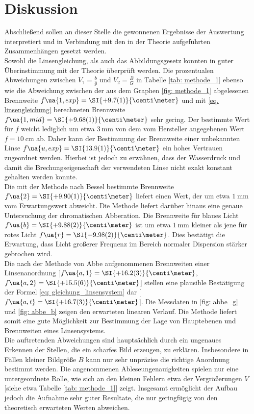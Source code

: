 \section{Diskussion}
Abschließend sollen an dieser Stelle die gewonnenen Ergebnisse der Auswertung interpretiert und
in Verbindung mit den in der Theorie aufgeführten Zusammenhängen gesetzt werden.\\
Sowohl die Linsengleichung, als auch das Abbildungsgesetz konnten in guter Überinstimmung
mit der Theorie überprüft werden. Die prozentualen Abweichungen zwischen $V_1 = \frac{b}{g}$ und $V_2 = \frac{B}{G}$ %
in Tabelle \ref{tab: methode_1} ebenso wie die Abweichung zwischen der aus dem Graphen \ref{fig: methode_1} abgelesenen Brennweite $f\ua{1, exp} = \SI{+9.7(1)}{\centi\meter}$ und mit \eqref{eq. linsengleichung} %
berechneten Brennweite $f\ua{1, mid} = \SI{+9.68(1)}{\centi\meter}$ sehr gering. Der bestimmte Wert für $f$ weicht lediglich um etwa $\SI{3}{\milli\meter}$ von dem vom Hersteller
angegebenen Wert $f = \SI{10}{\centi\meter}$ ab. Daher kann der Bestimmung der Brennweite einer unbekannten Linse $  f\ua{u, exp} = \SI{13.9(1)}{\centi\meter}$
ein hohes Vertrauen zugeordnet werden. Hierbei ist jedoch zu erwähnen, dass der Wasserdruck und damit die Brechungseigenschaft der %
verwendeten Linse nicht exakt konstant gehalten werden konnte. \\ %
Die mit der Methode nach Bessel bestimmte Brennweite $f\ua{2} = \SI{+9.90(1)}{\centi\meter}$ liefert einen Wert, der um etwa $\SI{1}{\milli\meter}$ vom Erwartungswert abweicht. Die Methode
liefert darüber hinaus eine genaue Untersuchung der chromatischen Abberation. Die Brennweite für blaues Licht $f\ua{b} = \SI{+9.88(2)}{\centi\meter}$ ist um etwa
$\SI{1}{\milli\meter}$ kleiner als jene für rotes Licht $f\ua{r} = \SI{+9.98(2)}{\centi\meter}$. Dies bestätigt die Erwartung, dass Licht großerer Frequenz im Bereich %
normaler Dispersion stärker gebrochen wird.\\
Die nach der Methode von Abbe aufgenommenen Brennweiten einer Linsenanordnung [$f\ua{a, 1} = \SI{+16.2(3)}{\centi\meter}$, $f\ua{a, 2} = \SI{+15.5(6)}{\centi\meter}$] stellen eine plausible Bestätigung der Formel
\eqref{eq: gleichung_linsensystem} dar [$f\ua{a, t} = \SI{+16.7(3)}{\centi\meter}$]. Die Messdaten in \ref{fig: abbe_g} und \ref{fig: abbe_b} zeigen den erwarteten linearen Verlauf.
Die Methode liefert somit eine gute Möglichkeit zur Bestimmung der Lage von Hauptebenen und Brennweiten eines Linsensystems.\\
Die auftretenden Abweichungen sind hauptsächlich durch ein ungenaues Erkennen der Stellen, die ein scharfes Bild erzeugen, zu erklären.
Insbesondere in Fällen kleiner Bildgröße $B$ kann nur sehr unpräzise die richtige Anordnung bestimmt werden. Die angenommenen Ableseungenauigkeiten
spielen nur eine untergeordnete Rolle, wie sich an den kleinen Fehlern etwa der Vergrößerungen $V$ [siehe etwa Tabelle \ref{tab: methode_1}] zeigt. %
Insgesamt ermöglicht der Aufbau jedoch die Aufnahme sehr guter Resultate, die nur geringfügig von den theoretisch erwarteten Werten abweichen. %
